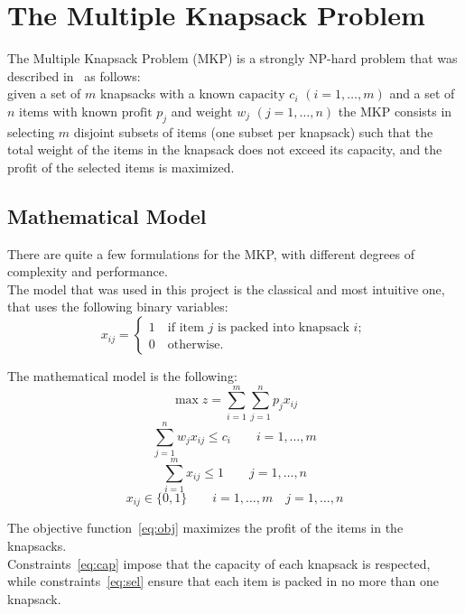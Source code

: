 \chapter{The Multiple Knapsack Problem}
The Multiple Knapsack Problem (MKP) is a strongly NP-hard problem
that was described in~\cite{mkp:2019} as follows:\\
given a set of \(m\) knapsacks with a known \(\text{capacity } c_{i}\)
\((i=1,\dots,m)\) and a set of \(n\) items with
known \(\text{profit } p_{j}\) and \(\text{weight } w_{j}\) \((j=1,\dots,n)\)
the MKP consists in selecting \(m\) disjoint subsets of items
(one subset per knapsack) such that the total weight of the items in the knapsack
does not exceed its capacity, and the profit of the selected items is maximized.


\section{Mathematical Model}\label{sec:model}
There are quite a few formulations for the MKP, with different degrees of
complexity and performance.\\
The model that was used in this project is the classical and most intuitive
one, that uses the following binary variables:
\[x_{ij}=
\begin{cases*}
    1 \quad \text{if item } j \text{ is packed into knapsack } i;\\
    0 \quad \text{otherwise}.
\end{cases*}
\]

The mathematical model is the following:
\begin{equation}
    \label{eq:obj}
    \max{z} = \sum_{i=1}^{m} \sum_{j=1}^{n} p_{j} x_{ij}
\end{equation}
\begin{equation}
    \label{eq:cap}
    \sum_{j=1}^{n} w_{j} x_{ij} \leq c_{i} \qquad i=1,\dots,m
\end{equation}
\begin{equation}
    \label{eq:sel}
    \sum_{i=1}^{m} x_{ij} \leq 1 \qquad j=1,\dots,n
\end{equation}
\begin{equation}
    x_{ij} \in \{0,1\} \qquad i=1,\dots,m \quad j=1,\dots,n
\end{equation}

The objective function~\eqref{eq:obj} maximizes the profit
of the items in the knapsacks.\\
Constraints~\eqref{eq:cap} impose that the capacity of each knapsack is respected,
while constraints~\eqref{eq:sel} ensure that each item
is packed in no more than one knapsack.

